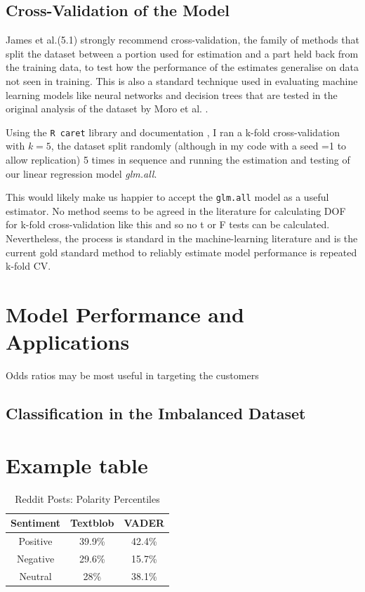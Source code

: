 \documentclass[9pt,technote]{IEEEtran}
\begin{document}
\subsection{Cross-Validation of the Model}
\label{subsec:crossval}

James et al.\cite{hastie21}(5.1) strongly recommend cross-validation, the family of methods that split the dataset between a portion used for estimation and a part held back from the training data, to test how the performance of the estimates generalise on data not seen in training.  This is also a standard technique used in evaluating machine learning models like neural networks and decision trees that are tested in the original analysis of the dataset by Moro et al. \cite{moro14}. 

Using the \texttt{R caret} library and documentation \cite{caretdocs}, I ran a k-fold cross-validation with $k=5$, the dataset split randomly (although in my code with a seed =1 to allow replication) 5 times in sequence and running the estimation and testing of our linear regression model \textit{glm.all}.  

 This would likely make us happier to accept the \texttt{glm.all} model as a useful estimator. No method seems to be agreed in the literature for calculating DOF for k-fold cross-validation like this and so no t or F tests can be calculated.  Nevertheless, the process is standard in the machine-learning literature and is \lqPerhaps the current gold standard method to reliably estimate model performance is repeated k-fold CV\rqssdfd.
\\

\section{Model Performance and Applications}

Odds ratios may be most useful in targeting the customers

\subsection{Classification in the Imbalanced Dataset}
\label{sec:imbalance}

\cite{lantz15} \cite{branco17}


\section{Example table} 
\begin{table}[htbp]
\caption{Reddit Posts: Polarity Percentiles }
\begin{center}
\begin{tabular}{|c|c|c|}
\hline
\textbf{Sentiment}&{\textbf{Textblob}}&{\textbf{VADER}} \\
\hline
Positive& 39.9\%&42.4\%\\
\hline
Negative& 29.6\%&15.7\%\\
\hline
Neutral& 28\%&38.1\%\\
\hline
\end{tabular}
\label{tab2}
\end{center}
\end{table}
\end{document}
